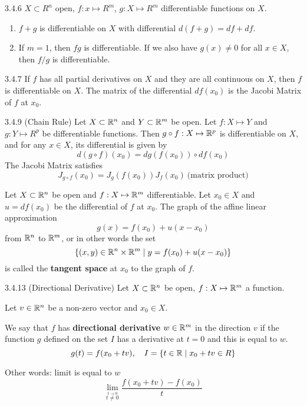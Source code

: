 \begin{proposition}{3.4.6}
    $X \subset R^n$ open, $f: x \mapsto R^m$, $g: X \mapsto R^m$ differentiable functions on $X$.
    \begin{enumerate}
        \item $f + g$ is differentiable on $X$ with differential $d(f + g) = df + df$.
        \item If $m = 1$, then $fg$ is differentiable. If we also have $g(x) \ne 0$ for all
              $x \in X$, then $f/g$ is differentiable.
    \end{enumerate}
\end{proposition}

\begin{proposition}{3.4.7}
    If $f$ has all partial derivatives on $X$ and they are all continuous on $X$, then $f$ is differentiable on $X$.
    The matrix of the differential $df(x_0)$ is the Jacobi Matrix of $f$ at $x_0$.
\end{proposition}

\begin{proposition}{3.4.9 (Chain Rule)}
    Let $X \subset \mathbb{R}^n$ and $Y \subset \mathbb{R}^m$ be open.
    Let $f: X \mapsto Y$ and $g: Y \mapsto R^p$ be differentiable functions.
    Then $g \circ f: X \mapsto \mathbb{R}^p$ is differentiable on $X$, and for any $x \in X$, its differential is given by
    \[ d(g \circ f)(x_0) = dg(f(x_0)) \circ df(x_0) \]
    The Jacobi Matrix satisfies
    \[ J_{g \circ f}(x_0) = J_g(f(x_0)) J_f(x_0)\ \mbox{(matrix product)}\]
\end{proposition}


\begin{definition}
    Let $X \subset \mathbb{R}^n$ be open and $f: X \mapsto \mathbb{R}^m$ differentiable.
    Let $x_0 \in X$ and $u = df(x_0)$ be the differential of $f$ at $x_0$. The graph of the affine linear approximation
    \[ g(x) = f(x_0) + u(x - x_0) \]
    from $\mathbb{R}^n$ to $\mathbb{R}^m$, or in other words the set
    \[ \left\{ (x,y) \in \mathbb{R}^n \times \mathbb{R}^m \mid y = f(x_0) + u(x - x_0) \right\} \]
    is called the \textbf{tangent space} at $x_0$ to the graph of $f$.
\end{definition}

\begin{definition}{3.4.13 (Directional Derivative)}
    Let $X \subset \mathbb{R}^n$ be open, $f: X \mapsto \mathbb{R}^m$ a function.

    Let $v \in \mathbb{R}^n$ be a non-zero vector and $x_0 \in X$.

    We say that $f$ has \textbf{directional derivative} $w \in \mathbb{R}^m$ in the direction $v$
    if the function $g$ defined on the set $I$ has a derivative at $t = 0$ and this is equal to $w$.
    \[ g(t) = f(x_0 + tv), \quad I = \left\{ t \in \mathbb{R} \mid x_0 + tv \in R \right\} \]

    Other words: limit is equal to $w$
    \[ \lim_{\stackrel{t \to 0}{t \ne 0}} \frac{f(x_0 + tv) - f(x_0)}{t} \]
\end{definition}

